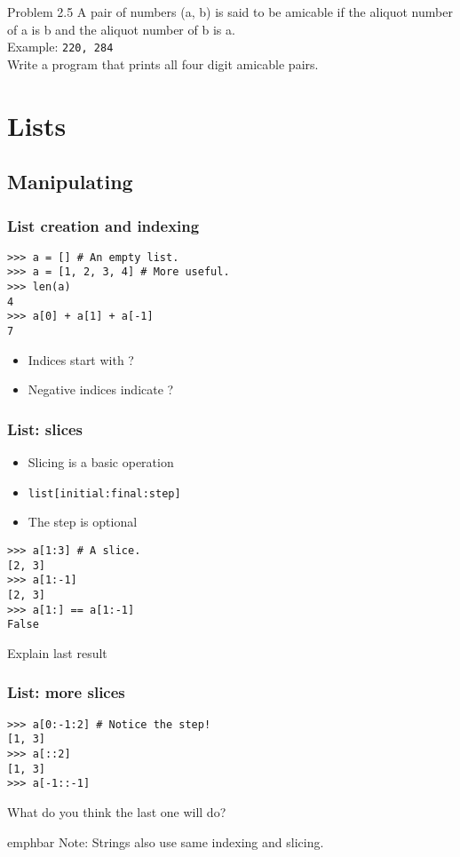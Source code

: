 \documentclass[14pt,compress]{beamer}
\newcommand{\emphbar}[1]
{\begin{beamercolorbox}[rounded=true]{emphbar} 
      {#1}
 \end{beamercolorbox}
}
\newcounter{time}
\newcommand{\inctime}[1]{\addtocounter{time}{#1}{\tiny \thetime\ m}}
\newcommand{\typ}[1]{\texttt{#1}}
\begin{document}
\begin{frame}{Problem 2.5}
  A pair of numbers (a, b) is said to be \alert{amicable} if the aliquot number of a is b and the aliquot number of b is a.\\
  Example: \texttt{220, 284}\\
  Write a program that prints all four digit amicable pairs.
  \inctime{25}
\end{frame}


\section{Lists}

\subsection{Manipulating}
\begin{frame}[fragile]
  \frametitle{List creation and indexing}
\begin{lstlisting}
>>> a = [] # An empty list.
>>> a = [1, 2, 3, 4] # More useful.
>>> len(a) 
4
>>> a[0] + a[1] + a[-1]
7
\end{lstlisting}
  \begin{itemize}
  \item Indices start with ?
  \item Negative indices indicate ?
  \end{itemize}
\end{frame}

\begin{frame}[fragile]
  \frametitle{List: slices}
  \begin{itemize}
  \item Slicing is a basic operation
  \item \typ{list[initial:final:step]}
  \item  The step is optional
  \end{itemize}
\begin{lstlisting}
>>> a[1:3] # A slice.
[2, 3]
>>> a[1:-1]
[2, 3]
>>> a[1:] == a[1:-1]
False  
\end{lstlisting}
Explain last result
\end{frame}

\begin{frame}[fragile]
  \frametitle{List: more slices}
\begin{lstlisting}
>>> a[0:-1:2] # Notice the step!
[1, 3]
>>> a[::2]
[1, 3]
>>> a[-1::-1]
\end{lstlisting}
What do you think the last one will do?
  \emphbar{Note: Strings also use same indexing and slicing.}
\end{frame}
\end{document}
